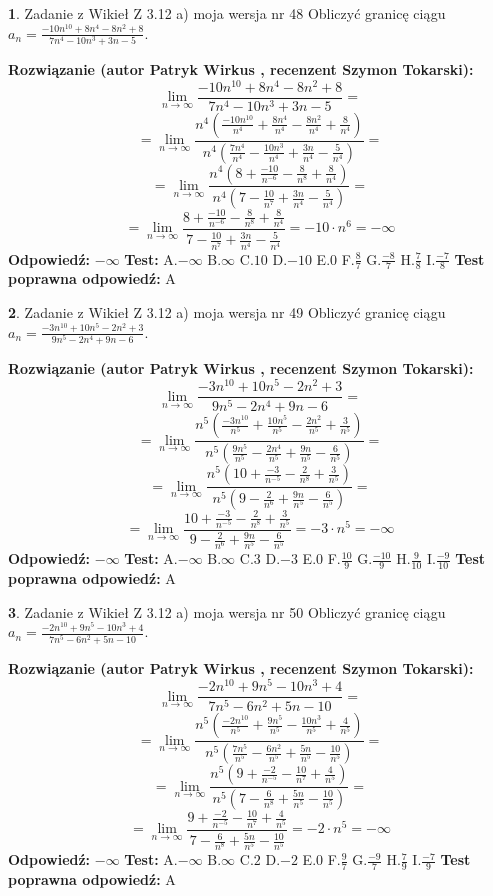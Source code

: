 \documentclass[12pt, a4paper]{article}
\theoremstyle{definition} %
\newtheorem{zad}{}
\newcommand{\zadStart}[1]{\begin{zad}#1\newline}
\newcommand{\zadStop}{\end{zad}}
\newcommand{\rozwStart}[2]{\noindent \textbf{Rozwiązanie (autor #1 , recenzent #2): }\newline}
\newcommand{\rozwStop}{\newline}
\newcommand{\odpStart}{\noindent \textbf{Odpowiedź:}\newline}
\newcommand{\odpStop}{\newline}
\newcommand{\testStart}{\noindent \textbf{Test:}\newline}
\newcommand{\testStop}{\newline}
\newcommand{\kluczStart}{\noindent \textbf{Test poprawna odpowiedź:}\newline}
\newcommand{\kluczStop}{\newline}
\begin{document}
\zadStart{Zadanie z Wikieł Z 3.12 a) moja wersja nr 48}
Obliczyć granicę ciągu $a_{n}=\frac{-10n^{10}+8n^{4}-8n^{2}+8}{7n^{4}-10n^{3}+3n-5}$.
\zadStop
\rozwStart{Patryk Wirkus}{Szymon Tokarski}
$$\lim\limits_{n\to\infty}\frac{-10n^{10}+8n^{4}-8n^{2}+8}{7n^{4}-10n^{3}+3n-5}=$$
$$=\lim\limits_{n\to\infty}\frac{n^{4}\left(\frac{-10n^{10}}{n^{4}}+\frac{8n^{4}}{n^{4}}-\frac{8n^{2}}{n^{4}}+\frac{8}{n^{4}}\right)}{n^{4}\left(\frac{7n^{4}}{n^{4}}-\frac{10n^{3}}{n^{4}}+\frac{3n}{n^{4}}-\frac{5}{n^{4}}\right)}=$$
$$=\lim\limits_{n\to\infty}\frac{n^{4}\left(8+\frac{-10}{n^{-6}}-\frac{8}{n^{8}}+\frac{8}{n^{4}}\right)}
{n^{4}\left(7-\frac{10}{n^{7}}+\frac{3n}{n^{4}}-\frac{5}{n^{4}}\right)}=$$
$$=\lim\limits_{n\to\infty}\frac{8+\frac{-10}{n^{-6}}-\frac{8}{n^{8}}+\frac{8}{n^{4}}}{7-\frac{10}{n^{7}}+\frac{3n}{n^{4}}-\frac{5}{n^{4}}}=-10\cdot n^{6} = -\infty$$
\rozwStop
\odpStart
$-\infty$
\odpStop
\testStart
A.$-\infty$
B.$\infty$
C.$10$
D.$-10$
E.$0$
F.$\frac{8}{7}$
G.$\frac{-8}{7}$
H.$\frac{7}{8}$
I.$\frac{-7}{8}$
\testStop
\kluczStart
A
\kluczStop



\zadStart{Zadanie z Wikieł Z 3.12 a) moja wersja nr 49}
Obliczyć granicę ciągu $a_{n}=\frac{-3n^{10}+10n^{5}-2n^{2}+3}{9n^{5}-2n^{4}+9n-6}$.
\zadStop
\rozwStart{Patryk Wirkus}{Szymon Tokarski}
$$\lim\limits_{n\to\infty}\frac{-3n^{10}+10n^{5}-2n^{2}+3}{9n^{5}-2n^{4}+9n-6}=$$
$$=\lim\limits_{n\to\infty}\frac{n^{5}\left(\frac{-3n^{10}}{n^{5}}+\frac{10n^{5}}{n^{5}}-\frac{2n^{2}}{n^{5}}+\frac{3}{n^{5}}\right)}{n^{5}\left(\frac{9n^{5}}{n^{5}}-\frac{2n^{4}}{n^{5}}+\frac{9n}{n^{5}}-\frac{6}{n^{5}}\right)}=$$
$$=\lim\limits_{n\to\infty}\frac{n^{5}\left(10+\frac{-3}{n^{-5}}-\frac{2}{n^{8}}+\frac{3}{n^{5}}\right)}
{n^{5}\left(9-\frac{2}{n^{6}}+\frac{9n}{n^{5}}-\frac{6}{n^{5}}\right)}=$$
$$=\lim\limits_{n\to\infty}\frac{10+\frac{-3}{n^{-5}}-\frac{2}{n^{8}}+\frac{3}{n^{5}}}{9-\frac{2}{n^{6}}+\frac{9n}{n^{5}}-\frac{6}{n^{5}}}=-3\cdot n^{5} = -\infty$$
\rozwStop
\odpStart
$-\infty$
\odpStop
\testStart
A.$-\infty$
B.$\infty$
C.$3$
D.$-3$
E.$0$
F.$\frac{10}{9}$
G.$\frac{-10}{9}$
H.$\frac{9}{10}$
I.$\frac{-9}{10}$
\testStop
\kluczStart
A
\kluczStop



\zadStart{Zadanie z Wikieł Z 3.12 a) moja wersja nr 50}
Obliczyć granicę ciągu $a_{n}=\frac{-2n^{10}+9n^{5}-10n^{3}+4}{7n^{5}-6n^{2}+5n-10}$.
\zadStop
\rozwStart{Patryk Wirkus}{Szymon Tokarski}
$$\lim\limits_{n\to\infty}\frac{-2n^{10}+9n^{5}-10n^{3}+4}{7n^{5}-6n^{2}+5n-10}=$$
$$=\lim\limits_{n\to\infty}\frac{n^{5}\left(\frac{-2n^{10}}{n^{5}}+\frac{9n^{5}}{n^{5}}-\frac{10n^{3}}{n^{5}}+\frac{4}{n^{5}}\right)}{n^{5}\left(\frac{7n^{5}}{n^{5}}-\frac{6n^{2}}{n^{5}}+\frac{5n}{n^{5}}-\frac{10}{n^{5}}\right)}=$$
$$=\lim\limits_{n\to\infty}\frac{n^{5}\left(9+\frac{-2}{n^{-5}}-\frac{10}{n^{7}}+\frac{4}{n^{5}}\right)}
{n^{5}\left(7-\frac{6}{n^{8}}+\frac{5n}{n^{5}}-\frac{10}{n^{5}}\right)}=$$
$$=\lim\limits_{n\to\infty}\frac{9+\frac{-2}{n^{-5}}-\frac{10}{n^{7}}+\frac{4}{n^{5}}}{7-\frac{6}{n^{8}}+\frac{5n}{n^{5}}-\frac{10}{n^{5}}}=-2\cdot n^{5} = -\infty$$
\rozwStop
\odpStart
$-\infty$
\odpStop
\testStart
A.$-\infty$
B.$\infty$
C.$2$
D.$-2$
E.$0$
F.$\frac{9}{7}$
G.$\frac{-9}{7}$
H.$\frac{7}{9}$
I.$\frac{-7}{9}$
\testStop
\kluczStart
A
\kluczStop
\end{document}
